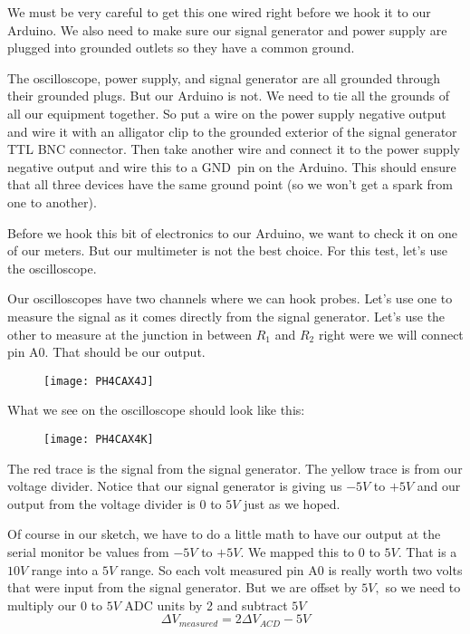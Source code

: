 We must be very careful to get this one wired right before we hook it to our
Arduino. We also need to make sure our signal generator and power supply are
plugged into grounded outlets so they have a common ground.

The oscilloscope, power supply, and signal generator are all grounded
through their grounded plugs. But our Arduino is not. We need to tie all the
grounds of all our equipment together. So put a wire on the power supply
negative output and wire it with an alligator clip to the grounded exterior
of the signal generator TTL BNC connector. Then take another wire and
connect it to the power supply negative output and wire this to a GND\ pin
on the Arduino. This should ensure that all three devices have the same
ground point (so we won't get a spark from one to another).

Before we hook this bit of electronics to our Arduino, we want to check it
on one of our meters. But our multimeter is not the best choice. For this
test, let's use the oscilloscope.

Our oscilloscopes have two channels where we can hook probes. Let's use one
to measure the signal as it comes directly from the signal generator. Let's
use the other to measure at the junction in between $R_{1}$ and $R_{2}$
right were we will connect pin A0. That should be our output. \begin{figure}[h!]
\texttt{[image: PH4CAX4J]}
\end{figure}

What we see on the oscilloscope should look like this: \begin{figure}[h!]
\texttt{[image: PH4CAX4K]}
\end{figure}The red trace is the signal from
the signal generator. The yellow trace is from our voltage divider. Notice
that our signal generator is giving us $-5\unit{V}$ to $+5\unit{V}$ and our
output from the voltage divider is $0$ to $5\unit{V}$ just as we hoped.

Of course in our sketch, we have to do a little math to have our output at
the serial monitor be values from $-5\unit{V}$ to $+5\unit{V}.$ We mapped
this to $0$ to $5\unit{V}.$ That is a $10\unit{V}$ range into a $5\unit{V}$
range. So each volt measured pin A0 is really worth two volts that were
input from the signal generator. But we are offset by $5\unit{V},$ so we
need to multiply our $0$ to $5\unit{V}$ ADC units by 2 and subtract $5\unit{V%
}$%
\begin{equation*}
\Delta V_{measured}=2\Delta V_{ACD}-5\unit{V}
\end{equation*}

